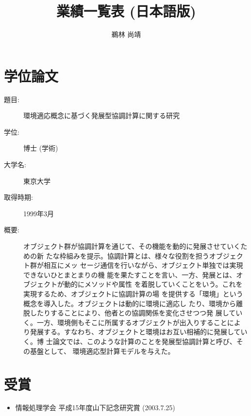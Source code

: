 \documentclass{jarticle}
\begin{document}
\title{業績一覧表 (日本語版)}
\author{鵜林 尚靖}
\maketitle


\section{学位論文}
\begin{description}
\item [題目:] 環境適応概念に基づく発展型協調計算に関する研究
\item [学位:] 博士 (学術)
\item [大学名:] 東京大学
\item [取得時期:] 1999年3月
\item [概要:]

オブジェクト群が協調計算を通じて、その機能を動的に発展させていくための新
たな枠組みを提示。協調計算とは、様々な役割を担うオブジェクト群が相互にメッ
セージ通信を行いながら、オブジェクト単独では実現できないひとまとまりの機
能を果たすことを言い、一方、発展とは、オブジェクトが動的にメソッドや属性
を着脱していくことをいう。これを実現するため、オブジェクトに協調計算の場
を提供する「環境」という概念を導入した。オブジェクトは動的に環境に適応し
たり、環境から離脱したりすることにより、他者との協調関係を変化させつつ発
展していく。一方、環境側もそこに所属するオブジェクトが出入りすることによ
り発展する。すなわち、オブジェクトと環境はお互い相補的に発展していく。博
士論文では、このような計算のことを発展型協調計算と呼び、その基盤として、
環境適応型計算モデルを与えた。
\end{description}


\section{受賞}
\begin{itemize}
\item 情報処理学会 平成15年度山下記念研究賞 (2003.7.25)
\end{itemize}


\newpage
\end{document}
